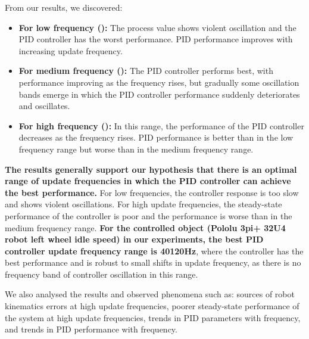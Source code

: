 \documentclass[conference]{IEEEtran}
\begin{document}
From our results, we discovered:
\begin{itemize}
    \item \textbf{For low frequency ():} The process value shows violent oscillation and the PID controller has the worst performance. PID performance improves with increasing update frequency. 
    \item \textbf{For medium frequency ():} The PID controller performs best, with performance improving as the frequency rises, but gradually some oscillation bands emerge in which the PID controller performance suddenly deteriorates and oscillates.
    \item \textbf{For high frequency ():} In this range, the performance of the PID controller decreases as the frequency rises. PID performance is better than in the low frequency range but worse than in the medium frequency range.
\end{itemize}

\textbf{The results generally support our hypothesis that there is an optimal range of update frequencies in which the PID controller can achieve the best performance.} For low frequencies, the controller response is too slow and shows violent oscillations. For high update frequencies, the steady-state performance of the controller is poor and the performance is worse than in the medium frequency range. \textbf{For the controlled object (Pololu 3pi+ 32U4 robot left wheel idle speed) in our experiments, the best PID controller update frequency range is 40\bm{$\sim$}120Hz}, where the controller has the best performance and is robust to small shifts in update frequency, as there is no frequency band of controller oscillation in this range.

We also analysed the results and observed phenomena such as: sources of robot kinematics errors at high update frequencies, poorer steady-state performance of the system at high update frequencies, trends in PID parameters with frequency, and trends in PID performance with frequency.
\end{document}
